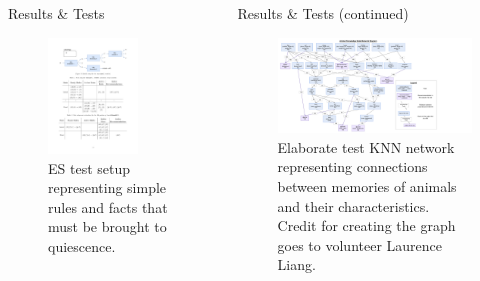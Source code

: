 \documentclass[final]{beamer} %
\newlength{\columnheight}
\begin{document}
\begin{frame}
\begin{columns}
\begin{column}{.34\textwidth}
{\begin{block}{Results \& Tests}
					\begin{figure}[!htb]
						\centering
						\includegraphics[width=0.7\textwidth]{figures/testES.pdf}
						\caption
						{ES test setup representing simple rules and facts that must be brought to quiescence.}
					\end{figure}
				\end{block}
				}
			\end{column}
			\begin{column}{.35\textwidth}
				\parbox[t][\columnheight]{\textwidth}{
				\begin{block}{Results \& Tests (continued)}
					\begin{figure}[!htb]
						\centering
						\includegraphics[width=\textwidth]{figures/animal_knn.pdf}
						\caption
						{Elaborate test KNN network representing connections between memories of animals and their characteristics. Credit for creating the graph goes to volunteer Laurence Liang.}
					\end{figure}
					

\end{block}}
\end{column}
\end{columns}
\end{frame}
\end{document}
